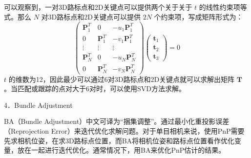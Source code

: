 可以观察到，一对3D路标点和2D关键点可以提供两个关于关于 $t$ 的线性约束项等式。那么 $N$ 对3D路标点和2D关键点可以提供 $2N$ 个约束项，写成矩阵形式为：
\begin{equation}
\label{eqn:3.78}
\left( \begin{array}{ccc}{\boldsymbol{P}_{1}^{T}} & {0} & {-u_{1} \boldsymbol{P}_{1}^{T}} \\ {0} & {\boldsymbol{P}_{1}^{T}} & {-v_{1} \boldsymbol{P}_{1}^{T}} \\ {\vdots} & {\vdots} & {\vdots} \\ {\boldsymbol{P}_{N}^{T}} & {0} & {-u_{N} \boldsymbol{P}_{N}^{T}} \\ {0} & {\boldsymbol{P}_{N}^{T}} & {-v_{N} \boldsymbol{P}_{N}^{T}}\end{array}\right) 
\left( \begin{array}{l}{\boldsymbol{t}_{1}} \\ {\boldsymbol{t}_{2}} \\ {\boldsymbol{t}_{3}}\end{array}\right)=0
\end{equation}
 $t$ 的维数为12，因此最少可以通过6对3D路标点和2D关键点就可以求解出矩阵 $ \boldsymbol{T} $ 。当匹配或跟踪的点对大于6对时，可以使用SVD方法求解。
 
 4．Bundle Adjustment
 
 BA（Bundle Adjustment）中文可译为“捆集调整”。通过最小化重投影误差（Reprojection Error）来迭代优化求解问题。对于单目相机来说，使用PnP需要先求相机位姿，在求3D路标点位置，而BA将相机位姿和路标点位置看作优化变量，放在一起进行迭代优化。通常情况下，用BA来优化PnP估计的结果。
 
